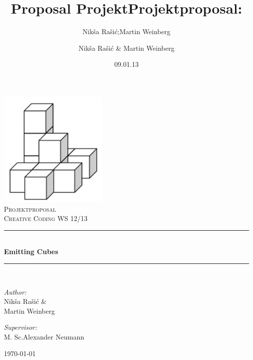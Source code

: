 \documentclass[pdftex,12pt,a4paper]{report}
\author{Nik\v{s}a Ra\v{s}i\'{c};Martin Weinberg}
\title{Proposal Projekt}
\newcommand{\HRule}{\rule{\linewidth}{0.5mm}}
\begin{document}
\title{Projektproposal:}
\date{09.01.13}
\author{Nik\v{s}a Ra\v{s}i\'{c} \& Martin Weinberg}

\begin{titlepage}
\begin{center}
\includegraphics[width=0.4\textwidth]{./wuerfel}\\[1cm]    

\textsc{\LARGE Projektproposal}\\[1.5cm]

\textsc{\Large Creative Coding WS 12/13 }\\[0.5cm]


\HRule \\[0.4cm]
{ \huge \bfseries Emitting Cubes}\\[0.4cm]

\HRule \\[1.5cm]

\begin{minipage}{0.4\textwidth}
\begin{flushleft} \large
\emph{Author:}\\
Nik\v{s}a Ra\v{s}i\'{c}  \&  \\ Martin Weinberg
\end{flushleft}
\end{minipage}
\begin{minipage}{0.4\textwidth}
\begin{flushright} \large
\emph{Supervisor:} \\ 
M. Sc.Alexander Neumann 
\end{flushright}
\end{minipage}

\vfill

{\large \today}

\end{center}

\end{titlepage}
\end{document}

